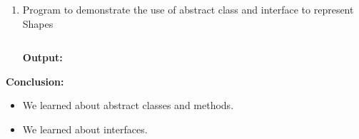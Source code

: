 \documentclass{book}
\begin{document}
{\begin{enumerate}
            
        \item{Program to demonstrate the use of abstract class and interface to represent Shapes}
            \par
            \inputminted{java}{homework/BankingSystem.java}
            \par
            \textbf{Output:}
            
    \end{enumerate}
    \par
    \textbf{Conclusion:}
    \begin{itemize}
        \item{We learned about abstract classes and methods.}
        \item{We learned about interfaces.}
    \end{itemize}
    
}
\end{document}
